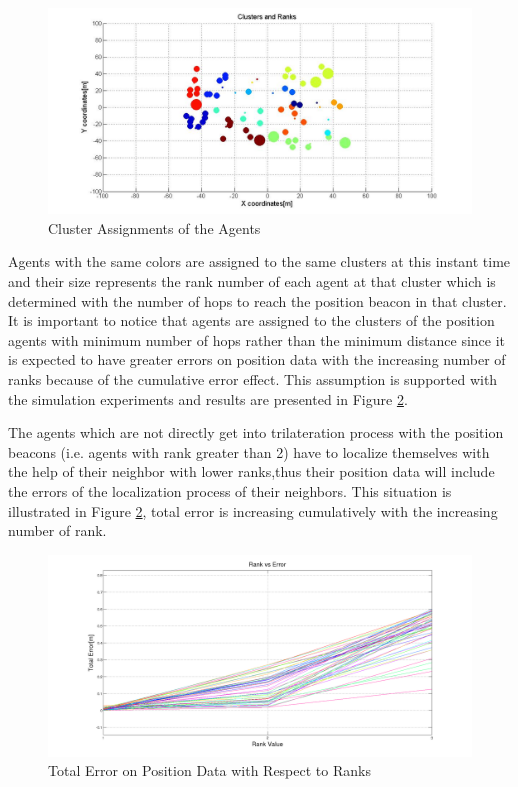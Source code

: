 \begin{figure}[H]
\caption{Cluster Assignments of the Agents} \label{Cluster_figure}
\centerline{\includegraphics[scale = 0.4]{Clusters_Ranks_1}}
\end{figure} 

Agents with the same colors are assigned to the same clusters at this instant time and their size represents the rank number of each agent at that cluster which is determined with the number of hops to reach the position beacon in that cluster. It is important to notice that agents are assigned to the clusters of the position agents with minimum number of hops rather than the minimum distance since it is expected to have greater errors on position data with the increasing number of ranks because of the cumulative error effect. This assumption is supported with the simulation experiments and results are presented in Figure \ref{cumulative_effect}. 

The agents which are not directly get into trilateration process with the position beacons (i.e. agents with rank greater than 2) have to localize themselves with the help of their neighbor with lower ranks,thus their position data will include the errors of the localization process of their neighbors. This situation is illustrated in Figure \ref{cumulative_effect}, total error is increasing cumulatively with the increasing number of rank. 
	
\begin{figure}[H]
\caption{Total Error on Position Data with Respect to Ranks} \label{cumulative_effect}
\centerline{\includegraphics[scale = 0.35]{rank_vs_error}}
\end{figure} 
	
